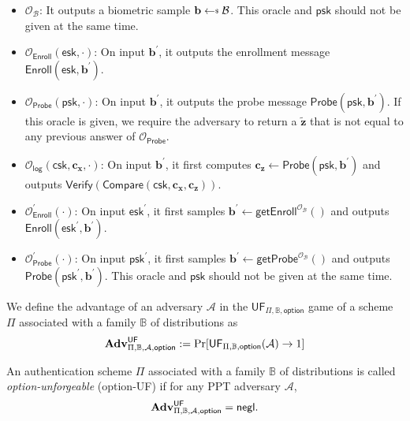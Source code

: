 \begin{itemize}

	\item $\mathcal{O}_{\mathcal{B}}$: It outputs a biometric sample $\mathbf{b} \getsdollar \mathcal{B}$. This oracle and $\textsf{psk}$ should not be given at the same time.
	
	\item $\mathcal{O}_\textsf{Enroll}(\textsf{esk}, \cdot)$: On input $\mathbf{b}^\prime$, it outputs the enrollment message $\textsf{Enroll}(\textsf{esk}, \mathbf{b}^\prime)$.

	\item $\mathcal{O}_\textsf{Probe}(\textsf{psk}, \cdot)$: On input $\mathbf{b}^\prime$, it outputs the probe message $\textsf{Probe}(\textsf{psk}, \mathbf{b}^\prime)$. If this oracle is given, we require the adversary to return a $\mathbf{\tilde{z}}$ that is not equal to any previous answer of $\mathcal{O}_\textsf{Probe}$.
	
	\item $\mathcal{O}_\textsf{log}(\textsf{csk}, \mathbf{c_x}, \cdot)$: On input $\mathbf{b}^\prime$, it first computes $\mathbf{c_z} \gets \textsf{Probe}(\textsf{psk}, \mathbf{b}^\prime)$ and outputs $\textsf{Verify}(\textsf{Compare}(\textsf{csk}, \mathbf{c_x}, \mathbf{c_z} ) )$.
	
	\item $\mathcal{O}_\textsf{Enroll}^\prime (\cdot)$: On input $\textsf{esk}^\prime$, it first samples $\mathbf{b}^\prime \gets \textsf{getEnroll}^{\mathcal{O}_{\mathcal{B}}}()$ and outputs $\textsf{Enroll}(\textsf{esk}^\prime, \mathbf{b}^\prime)$.

	\item $\mathcal{O}_\textsf{Probe}^\prime (\cdot)$: On input $\textsf{psk}^\prime$, it first samples $\mathbf{b}^\prime \gets \textsf{getProbe}^{\mathcal{O}_{\mathcal{B}}}()$ and outputs $\textsf{Probe}(\textsf{psk}^\prime, \mathbf{b}^\prime)$. This oracle and $\textsf{psk}$ should not be given at the same time. 
	
\end{itemize}

We define the advantage of an adversary $\mathcal{A}$ in the $\textsf{UF}_{\Pi, \mathbb{B}, \textsf{option}}$ game of a scheme $\Pi$ associated with a family $\mathbb{B}$ of distributions as
\[
	\mathbf{Adv}^{\textsf{UF}}_{\Pi, \mathbb{B}, \mathcal{A}, \textsf{option}} := \Pr[\textsf{UF}_{\Pi, \mathbb{B}, \textsf{option}}(\mathcal{A}) \to 1]
\]

An authentication scheme $\Pi$ associated with a family $\mathbb{B}$ of distributions is called \emph{\textsf{option}-unforgeable} (\textsf{option}-UF) if for any PPT adversary $\mathcal{A}$,
\[
	\mathbf{Adv}^{\textsf{UF}}_{\Pi, \mathbb{B}, \mathcal{A}, \textsf{option}} = \mathsf{negl}.
\]


